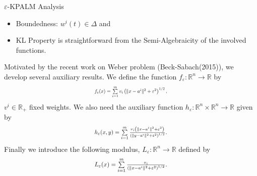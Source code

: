 \documentclass[9pt,handout]{beamer} %
\newenvironment{displaybox}[1]
{
  \centerline\bgroup\hfill
  \begin{beamerboxesrounded}[lower=default,shadow=true,width=#1]{}
}
{
  \end{beamerboxesrounded}\hfill\egroup
}
\newcommand{\rr}{\mathbb{R}} %
\begin{document}
	\begin{frame}{$\varepsilon$-KPALM Analysis}
		\begin{itemize}[<+->]
			\item Boundedness: $w^i(t) \in \Delta$ and \\
			\item KL Property is straightforward from the Semi-Algebraicity of the involved functions.
		\end{itemize}
		\pause
		\begin{displaybox}{11cm}
			Motivated by the recent work on Weber problem {\dblue (Beck-Sabach(2015))}, we develop several auxiliary results. We define the function $f_{\varepsilon}: \mathbb{R}^n \rightarrow \mathbb{R}$ by
			\begin{equation*}
				\resizebox{.3\hsize}{!}{$f_{\varepsilon}(x) = \sum\limits_{i=1}^{m} v_i \left( \|x - a^i\|^2 + {\varepsilon}^2 \right)^{1/2},$}
			\end{equation*}
			$v^i \in \rr_+$ fixed weights. We also need the auxiliary function $h_{\varepsilon}: \mathbb{R}^n \times \mathbb{R}^n \rightarrow \mathbb{R}$ given by
			\begin{equation*}
				\resizebox{.3\hsize}{!}{$h_{\varepsilon}(x,y) = \sum\limits_{i=1}^m \frac{v_i \left( \|x-a^i\|^2 + {\varepsilon}^2 \right)}{\left( \|y-a^i\|^2 + {\varepsilon}^2 \right)^{1/2}}.$}
			\end{equation*}
			Finally we introduce the following modulus, $L_{\varepsilon}: \mathbb{R}^n \rightarrow \mathbb{R}$ defined by
			\begin{equation*}
				\resizebox{.3\hsize}{!}{$L_{\varepsilon}(x) = \sum\limits_{i=1}^{m}\frac{v_i}{\left( \|x - a^i\|^2 + {\varepsilon}^2 \right)^{1/2}}.$}
			\end{equation*}
		\end{displaybox}
	\end{frame}
	
\end{document}
